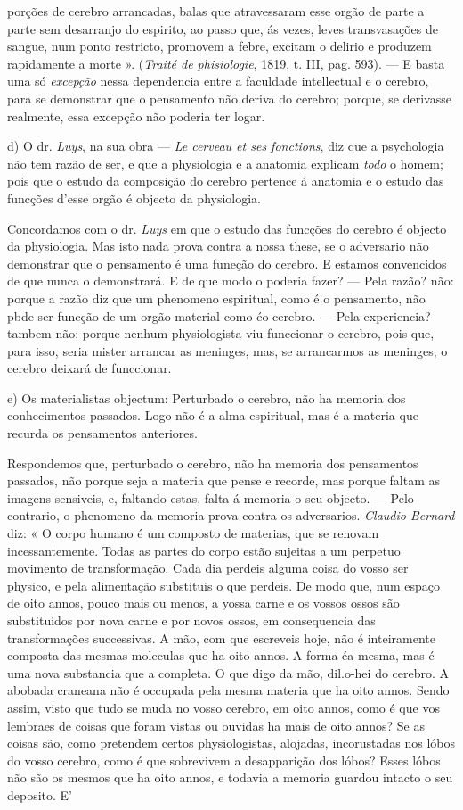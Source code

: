 porções de cerebro arrancadas, balas que atravessaram esse orgão de parte a parte sem desarranjo do espirito, ao passo que, ás vezes, leves transvasações de sangue, num ponto restricto, promovem a febre, excitam o delirio e produzem rapidamente a morte ». (\emph{Traité de phisiologie}, 1819, t. III, pag. 593). --- E basta uma só \emph{excepção} nessa dependencia entre a faculdade intellectual e o cerebro, para se demonstrar que o pensamento não deriva do cerebro; porque, se derivasse realmente, essa excepção não poderia ter logar.\par d) O dr. \emph{Luys}, na sua obra --- \emph{Le cerveau et ses fonctions}, diz que a psychologia não tem razão de ser, e que a physiologia e a anatomia explicam \emph{todo} o homem; pois que o estudo da composição do cerebro pertence á anatomia e o estudo das funcções d'esse orgão é objecto da physiologia.\par Concordamos com o dr. \emph{Luys} em que o estudo das funcções do cerebro é objecto da physiologia. Mas isto nada prova contra a nossa these, se o adversario não demonstrar que o pensamento é uma funeção do cerebro. E estamos convencidos de que nunca o demonstrará. E de que modo o poderia fazer? --- Pela razão? não: porque a razão diz que um phenomeno espiritual, como é o pensamento, não pbde ser funcção de um orgão material como éo cerebro. --- Pela experiencia? tambem não; porque nenhum physiologista viu funccionar o cerebro, pois que, para isso, seria mister arrancar as meninges, mas, se arrancarmos as meninges, o cerebro deixará de funccionar.\par e) Os materialistas objectum: Perturbado o cerebro, não ha memoria dos conhecimentos passados. Logo não é a alma espiritual, mas é a materia que recurda os pensamentos anteriores.\par Respondemos que, perturbado o cerebro, não ha memoria dos pensamentos passados, não porque seja a materia que pense e recorde, mas porque faltam as imagens sensiveis, e, faltando estas, falta á memoria o seu objecto. --- Pelo contrario, o phenomeno da memoria prova contra os adversarios. \emph{Claudio Bernard} diz: « O corpo humano é um composto de materias, que se renovam incessantemente. Todas as partes do corpo estão sujeitas a um perpetuo movimento de transformação. Cada dia perdeis alguma coisa do vosso ser physico, e pela alimentação substituis o que perdeis. De modo que, num espaço de oito annos, pouco mais ou menos, a yossa carne e os vossos ossos são substituidos por nova carne e por novos ossos, em consequencia das transformações successivas. A mão, com que escreveis hoje, não é inteiramente composta das mesmas moleculas que ha oito annos. A forma éa mesma, mas é uma nova substancia que a completa. O que digo da mão, dil.o-hei do cerebro. A abobada craneana não é occupada pela mesma materia que ha oito annos. Sendo assim, visto que tudo se muda no vosso cerebro, em oito annos, como é que vos lembraes de coisas que foram vistas ou ouvidas ha mais de oito annos? Se as coisas são, como pretendem certos physiologistas, alojadas, incorustadas nos lóbos do vosso cerebro, como é que sobrevivem a desapparição dos lóbos? Esses lóbos não são os mesmos que ha oito annos, e todavia a memoria guardou intacto o seu deposito. E' 